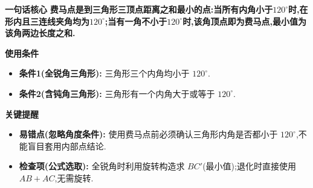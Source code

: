 \begin{summarybox}
	\textbf{\textcolor{CSummary}{一句话核心}}
	\textbf{费马点是到三角形三顶点距离之和最小的点:当所有内角小于$120^\circ$时,在形内且三连线夹角均为$120^\circ$;当有一角不小于$120^\circ$时,该角顶点即为费马点,最小值为该角两边长度之和.}

	\medskip
	\textbf{\textcolor{CSummary}{使用条件}}
	\begin{itemize}[leftmargin=*, itemsep=0.5em, topsep=0.4em]
		\item \textbf{条件1(全锐角三角形):} 三角形三个内角均小于 $120^\circ$.
		\item \textbf{条件2(含钝角三角形):} 三角形有一个内角大于或等于 $120^\circ$.
	\end{itemize}

	\medskip
	\textbf{\textcolor{CSummary}{关键提醒}}
	\begin{itemize}[leftmargin=*, itemsep=0.5em, topsep=0.4em]
		\item \textbf{易错点(忽略角度条件):} 使用费马点前必须确认三角形内角是否都小于 $120^\circ$,不能盲目套用内部点结论.
		\item \textbf{检查项(公式选取):} 全锐角时利用旋转构造求 $BC'$(最小值);退化时直接使用 $AB+AC$,无需旋转.
	\end{itemize}

\end{summarybox}
